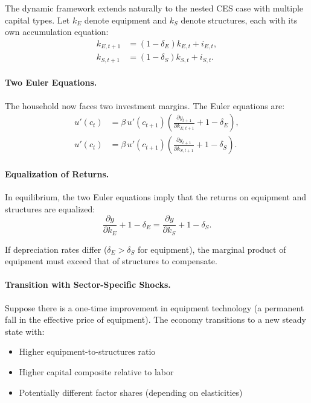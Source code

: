 The dynamic framework extends naturally to the nested CES case with multiple capital types. Let $k_E$ denote equipment and $k_S$ denote structures, each with its own accumulation equation:
\begin{align}
k_{E,t+1} &= (1-\delta_E) k_{E,t} + i_{E,t}, \label{eq:equipment-accumulation} \\[4pt]
k_{S,t+1} &= (1-\delta_S) k_{S,t} + i_{S,t}. \label{eq:structures-accumulation}
\end{align}

\paragraph{Two Euler Equations.}
The household now faces two investment margins. The Euler equations are:
\begin{align}
u'(c_t) &= \beta \, u'(c_{t+1}) \left( \frac{\partial y_{t+1}}{\partial k_{E,t+1}} + 1 - \delta_E \right), \label{eq:euler-equipment} \\[4pt]
u'(c_t) &= \beta \, u'(c_{t+1}) \left( \frac{\partial y_{t+1}}{\partial k_{S,t+1}} + 1 - \delta_S \right). \label{eq:euler-structures}
\end{align}

\paragraph{Equalization of Returns.}
In equilibrium, the two Euler equations imply that the returns on equipment and structures are equalized:
\begin{equation}
\frac{\partial y}{\partial k_E} + 1 - \delta_E = \frac{\partial y}{\partial k_S} + 1 - \delta_S.
\label{eq:return-equalization}
\end{equation}

If depreciation rates differ ($\delta_E > \delta_S$ for equipment), the marginal product of equipment must exceed that of structures to compensate.

\paragraph{Transition with Sector-Specific Shocks.}
Suppose there is a one-time improvement in equipment technology (a permanent fall in the effective price of equipment). The economy transitions to a new steady state with:
\begin{itemize}[nosep]
\item Higher equipment-to-structures ratio
\item Higher capital composite relative to labor
\item Potentially different factor shares (depending on elasticities)
\end{itemize}

